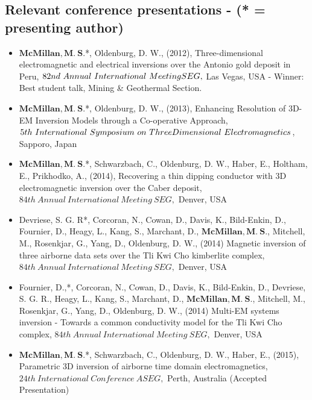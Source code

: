\documentclass[letterpaper,11pt]{article}
\begin{document}
\subsection{Relevant conference presentations - (* = presenting author)}
\begin{itemize}
\item
$\mathbf{McMillan, M. \ S.}$*, Oldenburg, D. W., (2012), Three-dimensional electromagnetic and electrical inversions over the Antonio gold deposit in Peru, $82nd \ Annual \ International \ Meeting \\ SEG,$  Las Vegas, USA - Winner: Best student talk, Mining \& Geothermal Section.
\item
 $\mathbf{McMillan, M. \ S.}$*, Oldenburg, D. W., (2013), Enhancing Resolution of 3D-EM Inversion Models through a Co-operative Approach, $ 5th \ International \ Symposium \ on \ Three \ \\ Dimensional \ Electromagnetics$, Sapporo, Japan
\item
$\mathbf{McMillan, M. \ S.}$*, Schwarzbach, C., Oldenburg, D. W., Haber, E., Holtham, E., Prikhodko, A., (2014), Recovering a thin dipping conductor with 3D electromagnetic inversion over the Caber deposit, $ 84th \ Annual \ International \ Meeting \ SEG,$ Denver, USA
\item
Devriese, S. G. R*, Corcoran, N., Cowan, D., Davis, K., Bild-Enkin, D., Fournier, D., Heagy, L., Kang, S., Marchant, D., $\mathbf{McMillan, M. \ S.}$, Mitchell, M., Rosenkjar, G., Yang, D., Oldenburg, D. W., (2014) Magnetic inversion of three airborne data sets over the Tli Kwi Cho kimberlite complex,
$ 84th \ Annual \ International \ Meeting \ SEG,$ Denver, USA
\item
Fournier, D.,*, Corcoran, N., Cowan, D., Davis, K., Bild-Enkin, D., Devriese, S. G. R., Heagy, L., Kang, S., Marchant, D., $\mathbf{McMillan, M. \ S.}$, Mitchell, M., Rosenkjar, G., Yang, D., Oldenburg, D. W., (2014) Multi-EM systems inversion - Towards a common conductivity model for the Tli Kwi Cho complex,
$ 84th \ Annual \ International \ Meeting \ SEG,$ Denver, USA

\item
$\mathbf{McMillan, M. \ S.}$*, Schwarzbach, C., Oldenburg, D. W., Haber, E., (2015), Parametric 3D inversion of airborne time domain electromagnetics, $ 24th \ International \ Conference \ ASEG, $ Perth, Australia (Accepted Presentation)

\end{itemize}
\end{document}
